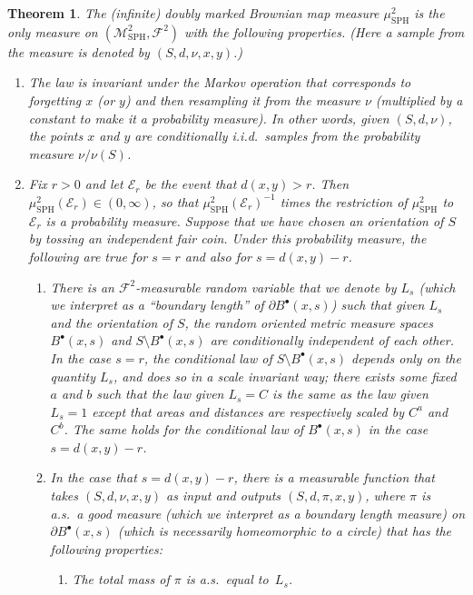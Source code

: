 \documentclass[JEP,XML,SOM,Unicode]{cedram}
\let\mathcal\mathscr
\newcommand{\sbullet}{{\scriptscriptstyle\bullet}}
\theoremstyle{plain}
\newtheorem{theorem}{Theorem}
\numberwithin{theorem}{section}
\theoremstyle{definition}
\newcommand\gmsspace{{\mathcal M}_{\mathrm{SPH}}}
\newcommand\mmsigma{{\mathcal F}}
\newcommand{\mustwo}{\mu_{\mathrm{SPH}}^2}
\newcommand{\fb}[2]{B^\sbullet(#1,#2)}
\begin{document}
\begin{theorem}
\label{thm::markovmapcharacterization}
The (infinite) doubly marked Brownian map measure $\mustwo$ is the only measure on $(\gmsspace^2, \mmsigma^2)$ with the following properties. (Here a sample from the measure is denoted by $(S,d,\nu,x,y)$.)
\begin{enumerate}
\item The law is invariant under the Markov operation that corresponds to forgetting $x$ (or $y$) and then resampling it from the measure $\nu$ (multiplied by a constant to make it a probability measure). In other words, given $(S,d,\nu)$, the points $x$ and $y$ are conditionally i.i.d.\ samples from the probability measure $\nu/\nu(S)$.
\item Fix $r > 0$ and let $\mathcal E_r$ be the event that $d(x,y) > r$. Then $\mustwo(\mathcal E_r) \in (0, \infty)$, so that $\mustwo(\mathcal E_r)^{-1}$ times the restriction of $\mustwo$ to $\mathcal E_r$ is a probability measure. Suppose that we have chosen an orientation of $S$ by tossing an independent fair coin. Under this probability measure, the following are true for $s = r$ and also for $s = d(x,y) - r$.
\begin{enumerate}
\item There is an $\mmsigma^2$-measurable random variable that we denote by $L_s$ (which we interpret as a ``boundary length'' of $\partial \fb{x}{s}$) such that \emph{given} $L_s$ and the orientation of $S$, the random oriented metric measure spaces $\fb{x}{s}$ and \hbox{$S \setminus \fb{x}{s}$} are conditionally independent of each other. In the case $s = r$, the conditional law of $S \setminus \fb{x}{s}$ depends only on the quantity $L_s$, and does so in a scale invariant way; \ie there exists some fixed $a$ and $b$ such that the law given $L_s = C$ is the same as the law given $L_s = 1$ except that areas and distances are respectively scaled by $C^a$ and $C^b$. The same holds for the conditional law of $\fb{x}{s}$ in the case $s = d(x,y)-r$.
\item In the case that $s=d(x,y) - r$, there is a measurable function that takes $(S,d,\nu,x,y)$ as input and outputs $(S,d,\pi,x,y)$, where $\pi$ is a.s.\ a good measure (which we interpret as a \emph{boundary length} measure) on $\partial \fb{x}{s}$ (which is necessarily homeomorphic to a circle) that has the following properties:
\begin{enumerate}\renewcommand{\theenumi}{\roman{enumi}}
\item The total mass of $\pi$ is a.s.\ equal to~$L_s$.

\end{enumerate}
\end{enumerate}
\end{enumerate}
\end{theorem}
\end{document}
